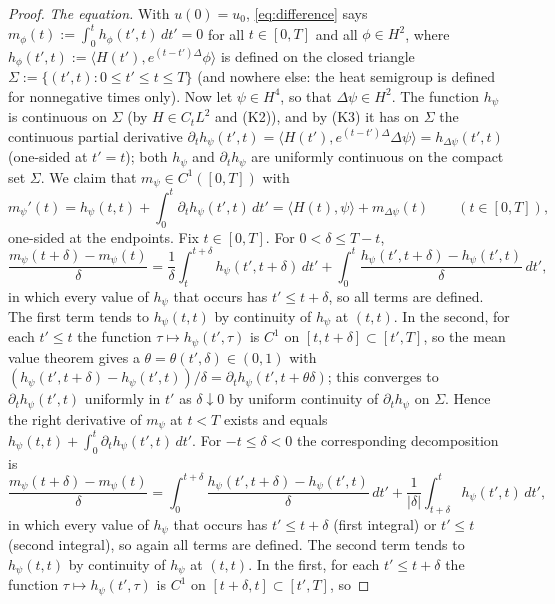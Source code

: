 \documentclass[11pt]{article}
\theoremstyle{definition}
\theoremstyle{plain}
\begin{document}
\begin{proof}
\emph{The equation.}  With $u(0)=u_0$, \eqref{eq:difference} says
$m_\phi(t):=\int_0^th_\phi(t',t)\,dt'=0$ for all $t\in[0,T]$ and all
$\phi\in H^2$, where $h_\phi(t',t):=\langle H(t'),e^{(t-t')\Delta}\phi
\rangle$ is defined on the closed triangle $\Sigma:=\{(t',t):0\leq t'\leq
t\leq T\}$ (and nowhere else: the heat semigroup is defined for
nonnegative times only).  Now let $\psi\in H^4$, so that $\Delta\psi\in
H^2$.  The function $h_\psi$ is continuous on $\Sigma$ (by $H\in C_tL^2$
and (K2)), and by (K3) it has on $\Sigma$ the continuous partial
derivative $\partial_th_\psi(t',t)=\langle H(t'),e^{(t-t')\Delta}\Delta
\psi\rangle=h_{\Delta\psi}(t',t)$ (one-sided at $t'=t$); both $h_\psi$
and $\partial_th_\psi$ are uniformly continuous on the compact set
$\Sigma$.  We claim that $m_\psi\in C^1([0,T])$ with
\begin{equation}\label{eq:m-derivative}
 m_\psi'(t)=h_\psi(t,t)+\int_0^t\partial_th_\psi(t',t)\,dt'
 =\langle H(t),\psi\rangle+m_{\Delta\psi}(t)
 \qquad(t\in[0,T]),
\end{equation}
one-sided at the endpoints.  Fix $t\in[0,T]$.  For $0<\delta\leq T-t$,
\[
 \frac{m_\psi(t+\delta)-m_\psi(t)}{\delta}
 =\frac1\delta\int_t^{t+\delta}h_\psi(t',t+\delta)\,dt'
 +\int_0^t\frac{h_\psi(t',t+\delta)-h_\psi(t',t)}{\delta}\,dt' ,
\]
in which every value of $h_\psi$ that occurs has $t'\leq t+\delta$, so all
terms are defined.  The first term tends to $h_\psi(t,t)$ by continuity of
$h_\psi$ at $(t,t)$.  In the second, for each $t'\leq t$ the function
$\tau\mapsto h_\psi(t',\tau)$ is $C^1$ on $[t,t+\delta]\subset[t',T]$, so
the mean value theorem gives a $\theta=\theta(t',\delta)\in(0,1)$ with
$(h_\psi(t',t+\delta)-h_\psi(t',t))/\delta=\partial_th_\psi(t',t+\theta
\delta)$; this converges to $\partial_th_\psi(t',t)$ uniformly in $t'$ as
$\delta\downarrow0$ by uniform continuity of $\partial_th_\psi$ on
$\Sigma$.  Hence the right derivative of $m_\psi$ at $t<T$ exists and
equals $h_\psi(t,t)+\int_0^t\partial_th_\psi(t',t)\,dt'$.  For
$-t\leq\delta<0$ the corresponding decomposition is
\[
 \frac{m_\psi(t+\delta)-m_\psi(t)}{\delta}
 =\int_0^{t+\delta}\frac{h_\psi(t',t+\delta)-h_\psi(t',t)}{\delta}\,dt'
 +\frac1{|\delta|}\int_{t+\delta}^{t}h_\psi(t',t)\,dt' ,
\]
in which every value of $h_\psi$ that occurs has $t'\leq t+\delta$ (first
integral) or $t'\leq t$ (second integral), so again all terms are defined.
The second term tends to $h_\psi(t,t)$ by continuity of $h_\psi$ at
$(t,t)$.  In the first, for each $t'\leq t+\delta$ the function
$\tau\mapsto h_\psi(t',\tau)$ is $C^1$ on $[t+\delta,t]\subset[t',T]$, so

\end{proof}
\end{document}
